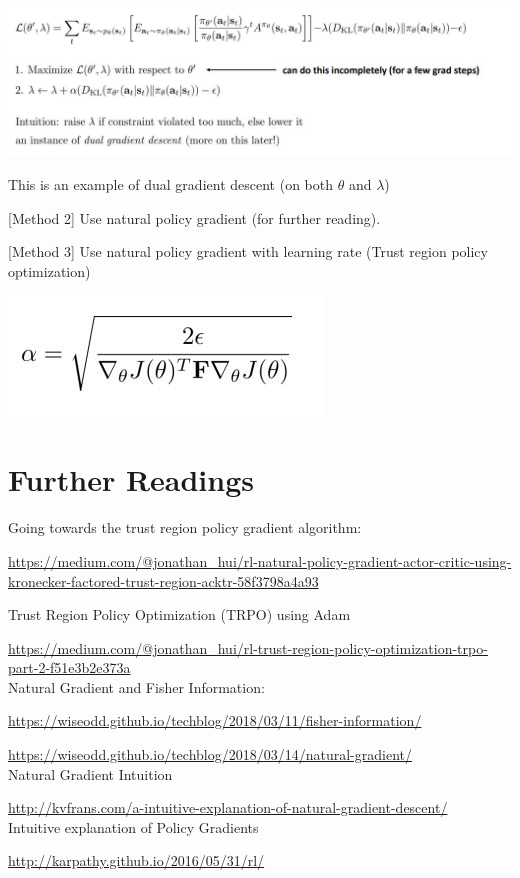 \documentclass{article}
\begin{document}
\includegraphics[scale=0.5]{lagrange_f.jpg}

This is an example of dual gradient descent (on both $\theta$ and $\lambda$)

[Method 2] Use natural policy gradient (for further reading). 

[Method 3] Use natural policy gradient with learning rate (Trust region policy optimization)

\includegraphics[scale=0.5]{trust_lr.jpg}

\section{Further Readings}
Going towards the trust region policy gradient algorithm:

\url{https://medium.com/@jonathan_hui/rl-natural-policy-gradient-actor-critic-using-kronecker-factored-trust-region-acktr-58f3798a4a93}

Trust Region Policy Optimization (TRPO) using Adam

\url{https://medium.com/@jonathan_hui/rl-trust-region-policy-optimization-trpo-part-2-f51e3b2e373a}\\

Natural Gradient and Fisher Information: 

\url{https://wiseodd.github.io/techblog/2018/03/11/fisher-information/}

\url{https://wiseodd.github.io/techblog/2018/03/14/natural-gradient/}\\


Natural Gradient Intuition

\url{ http://kvfrans.com/a-intuitive-explanation-of-natural-gradient-descent/}\\

Intuitive explanation of Policy Gradients

\url{http://karpathy.github.io/2016/05/31/rl/
}
\small


\end{document}

